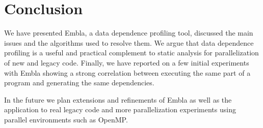 \documentclass[times, 10pt,twocolumn]{article}
\begin{document}
\section{Conclusion}

We have presented Embla, a data dependence profiling tool, discussed
the main issues and the algorithms used to resolve them. We argue that
data dependence profiling is a useful and practical complement to
static analysis for parallelization of new and legacy code. Finally,
we have reported on a few initial experiments with Embla showing a
strong correlation between executing the same part of a program and
generating the same dependencies.

In the future we plan extensions and refinements of Embla as well as
the application to real legacy code and 
more parallelization experiments using parallel environments such as
OpenMP.




\end{document}
